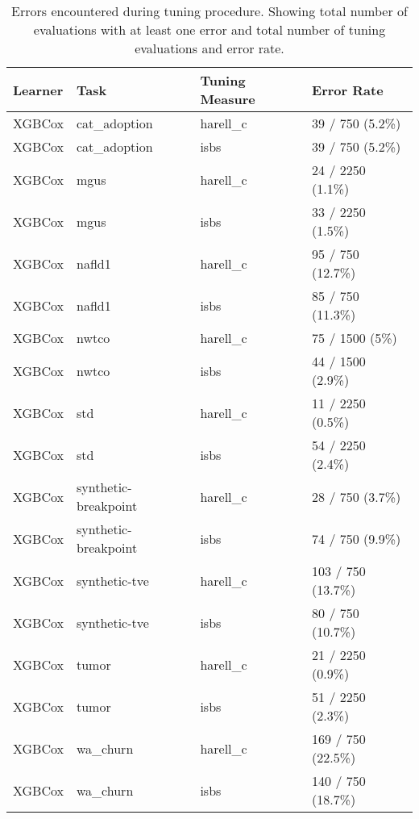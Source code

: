 \begin{table}
\centering
\caption{Errors encountered during tuning procedure. Showing total number of evaluations with at least one error and total number of tuning evaluations and error rate.\label{tab:bm-errors}}
\centering
\begin{tabular}[t]{llll}
\toprule
Learner & Task & Tuning Measure & Error Rate\\
\midrule
XGBCox & cat\_adoption & harell\_c & 39 / 750 (5.2\%)\\
XGBCox & cat\_adoption & isbs & 39 / 750 (5.2\%)\\
XGBCox & mgus & harell\_c & 24 / 2250 (1.1\%)\\
XGBCox & mgus & isbs & 33 / 2250 (1.5\%)\\
XGBCox & nafld1 & harell\_c & 95 / 750 (12.7\%)\\
XGBCox & nafld1 & isbs & 85 / 750 (11.3\%)\\
XGBCox & nwtco & harell\_c & 75 / 1500 (5\%)\\
XGBCox & nwtco & isbs & 44 / 1500 (2.9\%)\\
XGBCox & std & harell\_c & 11 / 2250 (0.5\%)\\
XGBCox & std & isbs & 54 / 2250 (2.4\%)\\
XGBCox & synthetic-breakpoint & harell\_c & 28 / 750 (3.7\%)\\
XGBCox & synthetic-breakpoint & isbs & 74 / 750 (9.9\%)\\
XGBCox & synthetic-tve & harell\_c & 103 / 750 (13.7\%)\\
XGBCox & synthetic-tve & isbs & 80 / 750 (10.7\%)\\
XGBCox & tumor & harell\_c & 21 / 2250 (0.9\%)\\
XGBCox & tumor & isbs & 51 / 2250 (2.3\%)\\
XGBCox & wa\_churn & harell\_c & 169 / 750 (22.5\%)\\
XGBCox & wa\_churn & isbs & 140 / 750 (18.7\%)\\
\bottomrule
\end{tabular}
\end{table}
